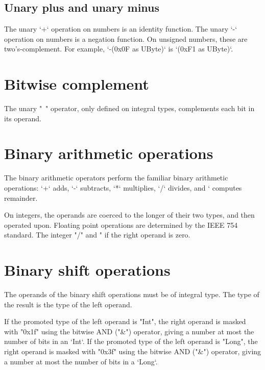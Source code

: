 \subsection{Unary plus and unary minus}

The unary \xcd`+` operation on numbers is an identity function.
The unary \xcd`-` operation on numbers is a negation function.
On unsigned numbers, these are two's-complement.  For example, 
\xcd`-(0x0F as UByte)` is 
\xcd`(0xF1 as UByte)`.



\section{Bitwise complement}

The unary \xcd"~" operator, only defined on integral types, complements each
bit in its operand.  

\section{Binary arithmetic operations} 

The binary arithmetic operators perform the familiar binary arithmetic
operations: \xcd`+` adds, \xcd`-` subtracts, \xcd`*` multiplies, 
\xcd`/` divides, and \xcd`%
computes remainder.

On integers, the operands are coerced to the longer of their two types, and
then operated upon.  
Floating point operations are determined by the IEEE 754
standard. 
The integer \xcd"/" and \xcd"%
if the right operand is zero.



\section{Binary shift operations}

The operands of the binary shift operations must be of integral type.
The type of the result is the type of the left operand.

If the promoted type of the left operand is \xcd"Int",
the right operand is masked with \xcd"0x1f" using the bitwise
AND (\xcd"&") operator, giving a number at most the number of bits in an
\xcd`Int`. 
If the promoted type of the left operand is \xcd"Long",
the right operand is masked with \xcd"0x3f" using the bitwise
AND (\xcd"&") operator, giving a number at most the number of bits in a
\xcd`Long`. 

